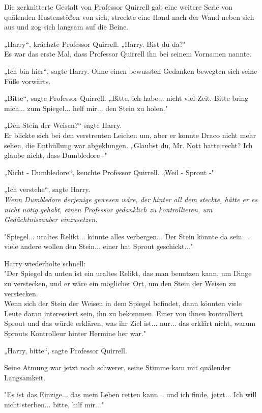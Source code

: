 {Die zerknitterte Gestalt von Professor Quirrell gab eine weitere Serie von quälenden Hustenstößen von sich, streckte eine Hand nach der Wand neben sich aus und zog sich langsam auf die Beine.

„Harry“, krächzte Professor Quirrell. „Harry. Bist du da?"\\ Es war das erste Mal, dass Professor Quirrell ihn bei seinem Vornamen nannte.

„Ich bin hier“, sagte Harry. Ohne einen bewussten Gedanken bewegten sich seine Füße vorwärts.

„Bitte“, sagte Professor Quirrell. „Bitte, ich habe... nicht viel Zeit. Bitte bring mich... zum Spiegel... helf mir... den Stein zu holen."

„Den Stein der Weisen?“ sagte Harry.\\ Er blickte sich bei den verstreuten Leichen um, aber er konnte Draco nicht mehr sehen, die Enthüllung war abgeklungen. „Glaubst du, Mr. Nott hatte recht? Ich glaube nicht, dass Dumbledore -"

„Nicht - Dumbledore“, keuchte Professor Quirrell. „Weil - Sprout -"

„Ich verstehe“, sagte Harry.\\ \emph{Wenn Dumbledore derjenige gewesen wäre, der hinter all dem steckte, hätte er es nicht nötig gehabt, einen Professor gedanklich zu kontrollieren, um Gedächtniszauber einzusetzen.}

"Spiegel... uraltes Relikt... könnte alles verbergen... Der Stein könnte da sein.... viele andere wollen den Stein... einer hat Sprout geschickt..."

Harry wiederholte schnell:\\ "Der Spiegel da unten ist ein uraltes Relikt, das man benutzen kann, um Dinge zu verstecken, und er wäre ein möglicher Ort, um den Stein der Weisen zu verstecken.\\ Wenn sich der Stein der Weisen in dem Spiegel befindet, dann könnten viele Leute daran interessiert sein, ihn zu bekommen. Einer von ihnen kontrolliert Sprout und das würde erklären, was ihr Ziel ist... nur... das erklärt nicht, warum Sprouts Kontrolleur hinter Hermine her war."

„Harry, bitte“, sagte Professor Quirrell.

Seine Atmung war jetzt noch schwerer, seine Stimme kam mit quälender Langsamkeit.

"Es ist das Einzige... das mein Leben retten kann... und ich finde, jetzt... Ich will nicht sterben... bitte, hilf mir..."

}
